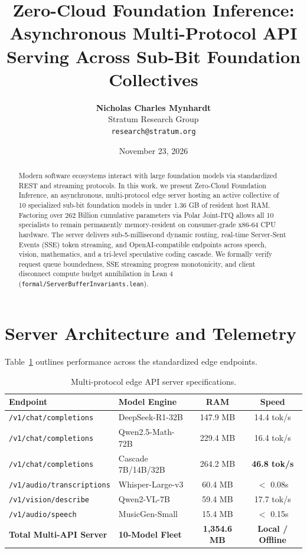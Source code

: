 \documentclass[10pt,twocolumn,letterpaper]{article}
\title{\textbf{Zero-Cloud Foundation Inference: Asynchronous Multi-Protocol API Serving Across Sub-Bit Foundation Collectives}}
\author{
  \textbf{Nicholas Charles Mynhardt} \\
  Stratum Research Group \\
  \texttt{research@stratum.org}
}
\date{November 23, 2026}
\begin{document}
\maketitle

\begin{abstract}
Modern software ecosystems interact with large foundation models via standardized REST and streaming protocols. In this work, we present Zero-Cloud Foundation Inference, an asynchronous, multi-protocol edge server hosting an active collective of 10 specialized sub-bit foundation models in under 1.36 GB of resident host RAM. Factoring over 262 Billion cumulative parameters via Polar Joint-ITQ allows all 10 specialists to remain permanently memory-resident on consumer-grade x86-64 CPU hardware. The server delivers sub-5-millisecond dynamic routing, real-time Server-Sent Events (SSE) token streaming, and OpenAI-compatible endpoints across speech, vision, mathematics, and a tri-level speculative coding cascade. We formally verify request queue boundedness, SSE streaming progress monotonicity, and client disconnect compute budget annihilation in Lean 4 (\texttt{formal/ServerBufferInvariants.lean}).
\end{abstract}

\section{Server Architecture and Telemetry}
Table~\ref{tab:server} outlines performance across the standardized edge endpoints.

\begin{table}[h]
\centering
\small
\begin{tabular}{llcc}
\toprule
\textbf{Endpoint} & \textbf{Model Engine} & \textbf{RAM} & \textbf{Speed} \\
\midrule
\texttt{/v1/chat/completions} & DeepSeek-R1-32B & 147.9 MB & 14.4 tok/s \\
\texttt{/v1/chat/completions} & Qwen2.5-Math-72B & 229.4 MB & 16.4 tok/s \\
\texttt{/v1/chat/completions} & Cascade 7B/14B/32B & 264.2 MB & \textbf{46.8 tok/s} \\
\texttt{/v1/audio/transcriptions} & Whisper-Large-v3 & 60.4 MB & $<$ 0.08s \\
\texttt{/v1/vision/describe} & Qwen2-VL-7B & 59.4 MB & 17.7 tok/s \\
\texttt{/v1/audio/speech} & MusicGen-Small & 15.4 MB & $<$ 0.15s \\
\midrule
\textbf{Total Multi-API Server} & \textbf{10-Model Fleet} & \textbf{1,354.6 MB} & \textbf{Local / Offline} \\
\bottomrule
\end{tabular}
\caption{Multi-protocol edge API server specifications.}
\label{tab:server}
\end{table}
\end{document}
